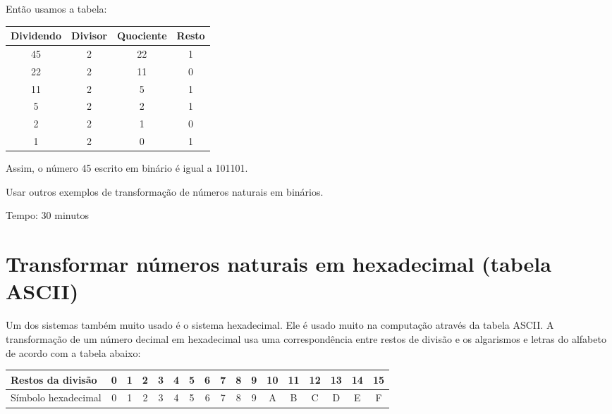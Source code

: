 \documentclass[12pt, openright, a4paper, brazil, openany, oneside]{abntex2}
\begin{document}
\begin{figure}[h]

    \center


\end{figure}


Então usamos a tabela:

 \begin{table}[h]
        \centering
        \begin{tabular}{|c|c|c|c|}
            \hline
            Dividendo & Divisor & Quociente & Resto \\
            \hline
            45 & 2 & 22 & 1 \\
            \hline
            22 & 2 & 11 & 0 \\
            \hline
            11 & 2 & 5 & 1 \\
            \hline
            5 & 2 & 2 & 1 \\
            \hline
            2 & 2 & 1 & 0 \\
            \hline
            1 & 2 & 0 & 1 \\
            \hline
        \end{tabular}
    \end{table}
Assim, o número 45 escrito em binário é igual a 101101.

Usar outros exemplos de transformação de números naturais em binários.

Tempo: 30 minutos


\section{Transformar números naturais em hexadecimal (tabela ASCII)}

Um dos sistemas também muito usado é o sistema hexadecimal. Ele é usado muito na computação através da tabela ASCII. A transformação de um número decimal em hexadecimal usa uma correspondência entre restos de divisão e os algarismos e letras do alfabeto de acordo com a tabela abaixo:

\begin{table}[h]
        \centering
        \begin{tabular}{|l|c|c|c|c|c|c|c|c|c|c|c|c|c|c|c|c|}
            \hline
            Restos da divisão & 0 & 1 & 2 & 3 & 4 & 5 & 6 & 7 & 8 & 9 & 10 & 11 & 12 & 13 & 14 & 15 \\
            \hline
            Símbolo hexadecimal & 0 & 1 & 2 & 3 & 4 & 5 & 6 & 7 & 8 & 9 & A & B & C & D & E & F \\
            \hline
        \end{tabular}
    \end{table}
\end{document}
